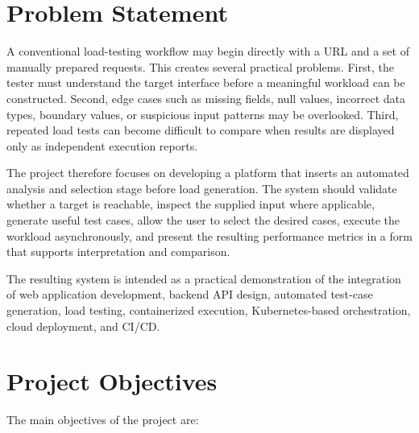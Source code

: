\documentclass{tietreport}
\begin{document}
\section{Problem Statement}

A conventional load-testing workflow may begin directly with a URL and a set of manually prepared requests. This creates several practical problems. First, the tester must understand the target interface before a meaningful workload can be constructed. Second, edge cases such as missing fields, null values, incorrect data types, boundary values, or suspicious input patterns may be overlooked. Third, repeated load tests can become difficult to compare when results are displayed only as independent execution reports.

The project therefore focuses on developing a platform that inserts an automated analysis and selection stage before load generation. The system should validate whether a target is reachable, inspect the supplied input where applicable, generate useful test cases, allow the user to select the desired cases, execute the workload asynchronously, and present the resulting performance metrics in a form that supports interpretation and comparison.

The resulting system is intended as a practical demonstration of the integration of web application development, backend API design, automated test-case generation, load testing, containerized execution, Kubernetes-based orchestration, cloud deployment, and CI/CD.

\section{Project Objectives}

The main objectives of the project are:
\end{document}

